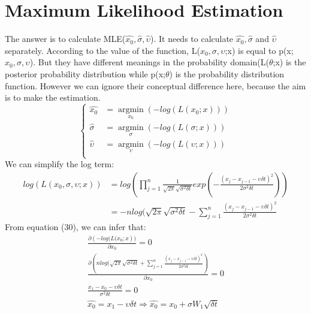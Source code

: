 \documentclass[twoside,11pt]{article}
\begin{document}
\section{Maximum Likelihood Estimation}
The answer is to calculate MLE($\hat{x_{0}}, \hat{\sigma},\hat{\upsilon}$). It needs to calculate $\hat{x_{0}}, \hat{\sigma}$ and $\hat{\upsilon}$ separately.
According to the value of the function, L(${x_{0}}, {\sigma},{\upsilon}$;x) is equal to p(x;${x_{0}}, {\sigma},{\upsilon}$). But they have different meanings in the probability domain(L($\theta$;x) is the posterior probability distribution while p(x;$\theta$) is the probability distribution function. However we can ignore their conceptual difference here, because the aim is to make the estimation.
\begin{equation}
    \left\{
             \begin{array}{lr}
              \hat{x_{0}} &= \underset{x_{0}}{\operatorname{argmin}}(-log(L({x_{0}};x)))\\
             \hat{\sigma} &= \underset{\sigma}{\operatorname{argmin}}(-log(L({\sigma};x)))\\
             \hat{\upsilon} &= \underset{\upsilon}{\operatorname{argmin}}(-log(L({\upsilon};x)))\\
             
             \end{array}
\right.
\end{equation}
We can simplify the log term:
\begin{equation}
    \begin{split}
       log(L({x_{0}}, {\sigma},{\upsilon};x)) &= log( \prod_{j=1}^{n}\frac{1}{\sqrt{2\pi}\sqrt{\sigma^{2}\delta t}}exp(-\frac{(x_{j}-x_{j-1}-\upsilon\delta t)^{2}}{2\sigma^{2}\delta t}))  \\
       &= -nlog(\sqrt{2\pi}\sqrt{\sigma^{2}\delta t}-\sum_{j=1}^{n}\frac{(x_{j}-x_{j-1}-\upsilon\delta t)^{2}}{2\sigma^{2}\delta t}
    \end{split}
\end{equation}
From equation (30), we can infer that:
\begin{align}
    \frac{\partial({-log(L({x_{0}};x}))}{\partial{x_{0}}} =0 \\
    \frac{\partial({nlog(\sqrt{2\pi}\sqrt{\sigma^{2}\delta t}+\sum_{j=1}^{n}\frac{(x_{j}-x_{j-1}-\upsilon\delta t)^{2}}{2\sigma^{2}\delta t}})}{\partial{x_{0}}} =0\\
    \frac{x_{1}-x_{0}-\upsilon\delta t}{\sigma^{2}\delta t} =0\\
    \hat{x_{0}} = x_{1} - \upsilon\delta t
    \Longrightarrow \hat{x_{0}} = x_{0} + \sigma W_{1}\sqrt{\delta t}
\end{align}
\end{document}
